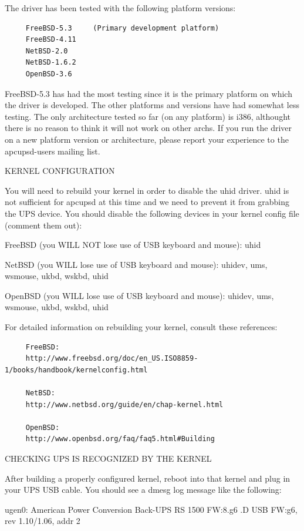 The driver has been tested with the following platform versions: 

\footnotesize
\begin{verbatim}
     FreeBSD-5.3     (Primary development platform)
     FreeBSD-4.11
     NetBSD-2.0
     NetBSD-1.6.2
     OpenBSD-3.6
\end{verbatim}
\normalsize

FreeBSD-5.3 has had the most testing since it is the primary platform on which
the driver is developed. The other platforms and versions have had somewhat
less testing. The only architecture tested so far (on any platform) is i386,
althought there is no reason to think it will not work on other archs. If you
run the driver on a new platform version or architecture, please report your
experience to the apcupsd-users mailing list.  

KERNEL CONFIGURATION  

You will need to rebuild your kernel in order to disable the uhid driver. uhid
is not sufficient for apcupsd at this time and we need to prevent it from
grabbing the UPS device. You should disable the following devices in your
kernel config file (comment them out):  

FreeBSD (you WILL NOT lose use of USB keyboard and mouse):  uhid  

NetBSD (you WILL lose use of USB keyboard and mouse):  uhidev, ums, wsmouse,
ukbd, wskbd, uhid  

OpenBSD (you WILL lose use of USB keyboard and mouse):  uhidev, ums, wsmouse,
ukbd, wskbd, uhid  

For detailed information on rebuilding your kernel, consult these references: 

\footnotesize
\begin{verbatim}
     FreeBSD:
     http://www.freebsd.org/doc/en_US.ISO8859-1/books/handbook/kernelconfig.html
     
     NetBSD:
     http://www.netbsd.org/guide/en/chap-kernel.html
     
     OpenBSD:
     http://www.openbsd.org/faq/faq5.html#Building
\end{verbatim}
\normalsize

CHECKING UPS IS RECOGNIZED BY THE KERNEL  

After building a properly configured kernel, reboot into that kernel and plug
in your UPS USB cable. You should see a dmesg log message like the following: 


ugen0: American Power Conversion Back-UPS RS 1500 FW:8.g6 .D USB FW:g6, rev
1.10/1.06, addr 2  

